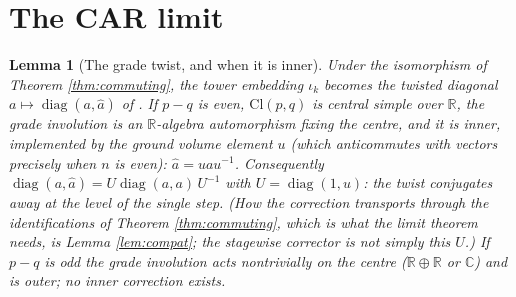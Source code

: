 \documentclass[11pt]{article}
\newtheorem{lemma}[theorem]{Lemma}
\theoremstyle{definition}
\newcommand{\Cl}{\mathrm{Cl}}
\newcommand{\R}{\mathbb{R}}
\newcommand{\C}{\mathbb{C}}
\begin{document}
\section{The CAR limit}\label{sec:limit}

\begin{lemma}[The grade twist, and when it is inner]\label{lem:twist}
Under the isomorphism of Theorem \ref{thm:commuting}, the tower embedding $\iota_k$ becomes the twisted diagonal $a \mapsto \operatorname{diag}(a, \hat a)$ of \cite[Thm.~7.1]{ButlerT1}. If $p - q$ is even, $\Cl(p,q)$ is central simple over $\R$, the grade involution is an $\R$-algebra automorphism fixing the centre, and it is inner, implemented by the ground volume element $u$ (which anticommutes with vectors precisely when $n$ is even): $\hat a = u a u^{-1}$. Consequently $\operatorname{diag}(a, \hat a) = U \operatorname{diag}(a, a)\, U^{-1}$ with $U = \operatorname{diag}(1, u)$: the twist conjugates away at the level of the single step. (How the correction transports through the identifications of Theorem \ref{thm:commuting}, which is what the limit theorem needs, is Lemma \ref{lem:compat}; the stagewise corrector is \emph{not} simply this $U$.) If $p - q$ is odd the grade involution acts nontrivially on the centre ($\R \oplus \R$ or $\C$) and is outer; no inner correction exists.
\end{lemma}
\end{document}

